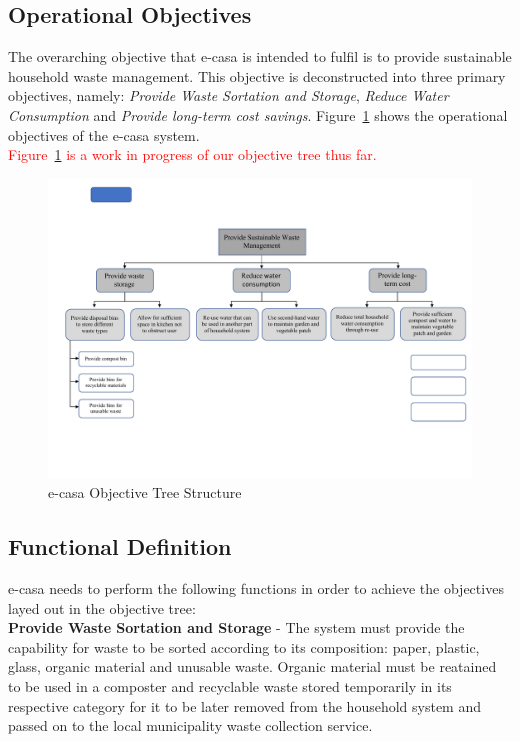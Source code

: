 \documentclass[a4paper,11pt,fleqn]{report}
\begin{document}
\subsection{Operational Objectives}
The overarching objective that \ac{e-casa} is intended to fulfil is to provide sustainable household waste management. This objective is deconstructed into three primary objectives, namely: \textit{Provide Waste Sortation and Storage}, \textit{Reduce Water Consumption} and \textit{Provide long-term cost savings}. Figure~\ref{fig: ecasaOT} shows the operational objectives of the \ac{e-casa} system.\\

\textcolor{red}{Figure~\ref{fig: ecasaOT} is a work in progress of our objective tree thus far.}

\begin{figure}[h!]
\begin{center}
\includegraphics[scale = 0.55]{Objective_Tree_ecasa.pdf}
\caption{e-casa Objective Tree Structure}
\label{fig: ecasaOT}
\end{center}
\end{figure}

\subsection{Functional Definition}
\ac{e-casa} needs to perform the following functions in order to achieve the objectives layed out in the objective tree:\\

\noindent\textbf{Provide Waste Sortation and Storage} - The system must provide the capability for waste to be sorted according to its composition: paper, plastic, glass, organic material and unusable waste. Organic material must be reatained to be used in a composter and recyclable waste stored temporarily in its respective category for it to be later removed from the household system and passed on to the local municipality waste collection service.\\
\end{document}
